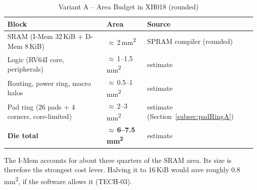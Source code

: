 \begin{table}[H]
\caption{Variant A -- Area Budget in XH018 (rounded)}
\label{tab:asTechAreaA}
\centering
\begin{tabularx}{\textwidth}{|X |l |X|}
  \hline
  Block & Area & Source \\
  \hline
  \hline
  SRAM (I-Mem 32\,KiB + D-Mem 8\,KiB) & $\approx$\,2\,mm\textsuperscript{2} & SPRAM compiler (rounded) \\
  \hline
  Logic (RV64I core, peripherals) & $\approx$\,1--1.5\,mm\textsuperscript{2} & estimate \\
  \hline
  Routing, power ring, macro halos & $\approx$\,0.5--1\,mm\textsuperscript{2} & estimate \\
  \hline
  Pad ring (26 pads + 4 corners, core-limited) & $\approx$\,2--3\,mm\textsuperscript{2} & estimate (Section~\ref{subsec:padRingA}) \\
  \hline
  \textbf{Die total} & $\approx$\,\textbf{6--7.5\,mm\textsuperscript{2}} & estimate \\
  \hline
\end{tabularx}
\end{table}

The I-Mem accounts for about three quarters of the SRAM area. Its size is
therefore the strongest cost lever. Halving it to 16\,KiB would save roughly
0.8\,mm\textsuperscript{2}, if the software allows it (TECH-03).
